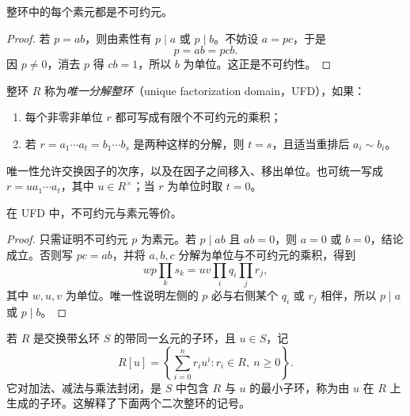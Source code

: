 \documentclass[lang=cn,a4paper,fontset=none,zihao=false,10pt,openany,twoside]{beautybook}
\numberwithin{algorithm}{chapter}
\begin{document}
\begin{proposition}
整环中的每个素元都是不可约元。
\end{proposition}
\begin{proof}
若 $p=ab$，则由素性有 $p\mid a$ 或 $p\mid b$。不妨设 $a=pc$，于是
\[
 p=ab=pcb.
\]
因 $p\ne0$，消去 $p$ 得 $cb=1$，所以 $b$ 为单位。这正是不可约性。
\end{proof}

\begin{definition}[唯一分解整环]
整环 $R$ 称为\emph{唯一分解整环}（unique factorization domain，UFD），如果：
\begin{enumerate}[(1)]
\item 每个非零非单位 $r$ 都可写成有限个不可约元的乘积；
\item 若 $r=a_1\cdots a_t=b_1\cdots b_s$ 是两种这样的分解，则 $t=s$，且适当重排后 $a_i\sim b_i$。
\end{enumerate}
唯一性允许交换因子的次序，以及在因子之间移入、移出单位。也可统一写成 $r=u a_1\cdots a_t$，其中 $u\in R^\times$；当 $r$ 为单位时取 $t=0$。
\end{definition}

\begin{proposition}[唯一分解中的素性]\label{prop:ufd-prime}
在 UFD 中，不可约元与素元等价。
\end{proposition}
\begin{proof}
只需证明不可约元 $p$ 为素元。若 $p\mid ab$ 且 $ab=0$，则 $a=0$ 或 $b=0$，结论成立。否则写 $pc=ab$，并将 $a,b,c$ 分解为单位与不可约元的乘积，得到
\[
 w p\prod_k s_k=u v\prod_i q_i\prod_j r_j,
\]
其中 $w,u,v$ 为单位。唯一性说明左侧的 $p$ 必与右侧某个 $q_i$ 或 $r_j$ 相伴，所以 $p\mid a$ 或 $p\mid b$。
\end{proof}

若 $R$ 是交换带幺环 $S$ 的带同一幺元的子环，且 $u\in S$，记
\[
 R[u]=\left\{\sum_{i=0}^n r_i u^i:r_i\in R,\ n\ge0\right\}.
\]
它对加法、减法与乘法封闭，是 $S$ 中包含 $R$ 与 $u$ 的最小子环，称为由 $u$ 在 $R$ 上生成的子环。这解释了下面两个二次整环的记号。
\end{document}
